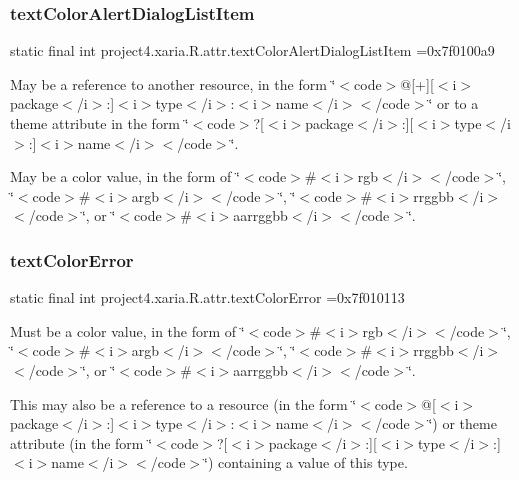 \subsubsection{\texorpdfstring{text\+Color\+Alert\+Dialog\+List\+Item}{textColorAlertDialogListItem}}
{\footnotesize\ttfamily static final int project4.\+xaria.\+R.\+attr.\+text\+Color\+Alert\+Dialog\+List\+Item =0x7f0100a9\hspace{0.3cm}{\ttfamily [static]}}

May be a reference to another resource, in the form \char`\"{}$<$code$>$@\mbox{[}+\mbox{]}\mbox{[}$<$i$>$package$<$/i$>$\+:\mbox{]}$<$i$>$type$<$/i$>$\+:$<$i$>$name$<$/i$>$$<$/code$>$\char`\"{} or to a theme attribute in the form \char`\"{}$<$code$>$?\mbox{[}$<$i$>$package$<$/i$>$\+:\mbox{]}\mbox{[}$<$i$>$type$<$/i$>$\+:\mbox{]}$<$i$>$name$<$/i$>$$<$/code$>$\char`\"{}. 

May be a color value, in the form of \char`\"{}$<$code$>$\#$<$i$>$rgb$<$/i$>$$<$/code$>$\char`\"{}, \char`\"{}$<$code$>$\#$<$i$>$argb$<$/i$>$$<$/code$>$\char`\"{}, \char`\"{}$<$code$>$\#$<$i$>$rrggbb$<$/i$>$$<$/code$>$\char`\"{}, or \char`\"{}$<$code$>$\#$<$i$>$aarrggbb$<$/i$>$$<$/code$>$\char`\"{}. \mbox{\label{classproject4_1_1xaria_1_1R_1_1attr_aa6347fcc9a0a66441093bf4b109a507f}} 
\subsubsection{\texorpdfstring{text\+Color\+Error}{textColorError}}
{\footnotesize\ttfamily static final int project4.\+xaria.\+R.\+attr.\+text\+Color\+Error =0x7f010113\hspace{0.3cm}{\ttfamily [static]}}

Must be a color value, in the form of \char`\"{}$<$code$>$\#$<$i$>$rgb$<$/i$>$$<$/code$>$\char`\"{}, \char`\"{}$<$code$>$\#$<$i$>$argb$<$/i$>$$<$/code$>$\char`\"{}, \char`\"{}$<$code$>$\#$<$i$>$rrggbb$<$/i$>$$<$/code$>$\char`\"{}, or \char`\"{}$<$code$>$\#$<$i$>$aarrggbb$<$/i$>$$<$/code$>$\char`\"{}. 

This may also be a reference to a resource (in the form \char`\"{}$<$code$>$@\mbox{[}$<$i$>$package$<$/i$>$\+:\mbox{]}$<$i$>$type$<$/i$>$\+:$<$i$>$name$<$/i$>$$<$/code$>$\char`\"{}) or theme attribute (in the form \char`\"{}$<$code$>$?\mbox{[}$<$i$>$package$<$/i$>$\+:\mbox{]}\mbox{[}$<$i$>$type$<$/i$>$\+:\mbox{]}$<$i$>$name$<$/i$>$$<$/code$>$\char`\"{}) containing a value of this type. \mbox{\label{classproject4_1_1xaria_1_1R_1_1attr_aafc8d313efe2f31bd9ec158c52b42411}} 
